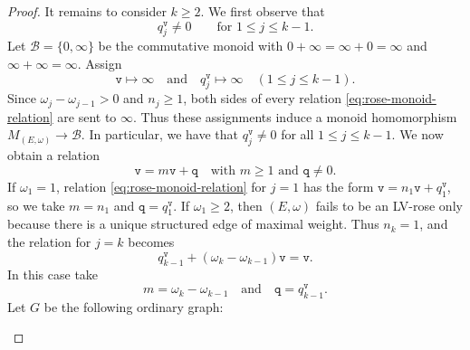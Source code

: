 \documentclass{article}
\theoremstyle{definition}
\begin{document}
\begin{proof}
It remains to consider $k\geq2$. We first observe that
$$
q^{\mathtt{v}}_j\neq0
\qquad\text{for }1\leq j\leq k-1.
$$
Let $\mathcal B=\{0,\infty\}$ be the commutative monoid with
$0+\infty=\infty+0=\infty$ and $\infty+\infty=\infty$. Assign
$$
\mathtt{v}\longmapsto\infty
\quad\text{and}\quad
q^{\mathtt{v}}_j\longmapsto\infty
\quad (1\leq j\leq k-1).
$$
Since $\omega_j-\omega_{j-1}>0$ and $n_j\geq1$, both sides of every
relation \eqref{eq:rose-monoid-relation} are sent to $\infty$. Thus these
assignments induce a monoid homomorphism $M_{(E,\omega)}\longrightarrow\mathcal B$.
In particular, we have that $q^{\mathtt{v}}_j\ne 0$ for all $1\leq j\leq k-1$. We now obtain a relation
\begin{equation}\label{eq:v-mv-q}
\mathtt{v}=m\mathtt{v}+\mathtt{q}\quad\text{with } m\geq1\text{ and }\mathtt{q}\neq0.
\end{equation}
If $\omega_1=1$, relation
\eqref{eq:rose-monoid-relation} for $j=1$ has the form $\mathtt{v}=n_1\mathtt{v}+q^{\mathtt{v}}_1$,
so we take $m=n_1$ and $\mathtt{q}=q^{\mathtt{v}}_1$. If
$\omega_1\geq2$, then $(E,\omega)$ fails to be an LV-rose only because
there is a unique structured edge of maximal weight. Thus $n_k=1$, and
the relation for $j=k$ becomes
$$
q^{\mathtt{v}}_{k-1}
+(\omega_k-\omega_{k-1})\mathtt{v}
=\mathtt{v}.
$$
In this case take
$$
m=\omega_k-\omega_{k-1} 
\quad\text{and}\quad \mathtt{q}=q^{\mathtt{v}}_{k-1}.
$$
Let $G$ be the following ordinary graph:
\begin{figure}[H]
\centering
{}
\end{figure}
\end{proof}
\end{document}
